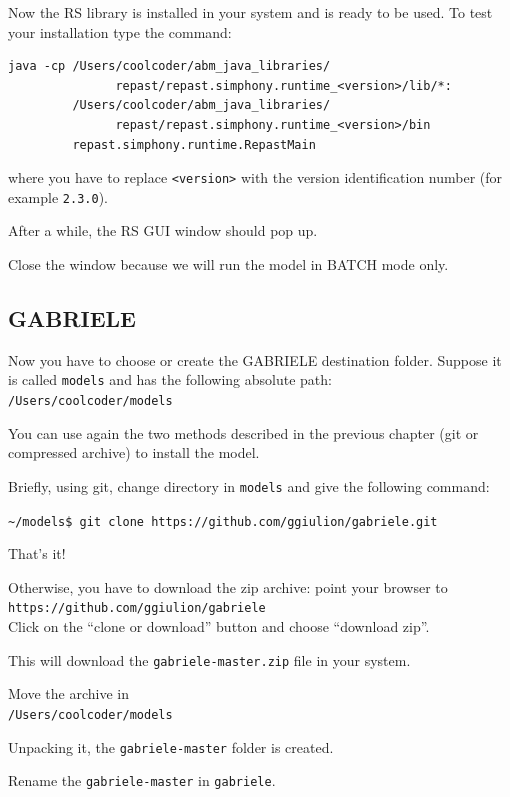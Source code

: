 \documentclass{book}
\begin{document}
Now the RS library is installed in your system and is ready to be used.
To test your installation type the command:\\
\begin{verbatim}
java -cp /Users/coolcoder/abm_java_libraries/
               repast/repast.simphony.runtime_<version>/lib/*:
         /Users/coolcoder/abm_java_libraries/
               repast/repast.simphony.runtime_<version>/bin 
         repast.simphony.runtime.RepastMain
\end{verbatim}
where you have to replace \verb+<version>+ with the version identification number (for example \verb+2.3.0+).

After a while, the RS GUI window should pop up.

Close the window because we will run the model in BATCH mode only.



\subsection{GABRIELE}

Now you have to choose or create the GABRIELE destination folder.
Suppose it is called \verb+models+ and has the following absolute path: \\
\verb+/Users/coolcoder/models+

You can use again the two methods described in the previous chapter (git or compressed archive) to install the model. 

Briefly, using git, change directory in \verb+models+ and give the following command:

\vskip2mm
\noindent\verb+~/models$ +\color{red}\verb+git clone https://github.com/ggiulion/gabriele.git+ \color{black}

\vskip2mm
That's it!

Otherwise, you have to download the zip archive: point your browser to\\ 
\verb+https://github.com/ggiulion/gabriele+\\
Click on the ``clone or download'' button and choose ``download zip''.

This will download the \verb+gabriele-master.zip+ file in your system.

Move the archive in\\
\verb+/Users/coolcoder/models+

Unpacking it, the \verb+gabriele-master+ folder is created.

Rename the \verb+gabriele-master+ in \verb+gabriele+.
\end{document}
